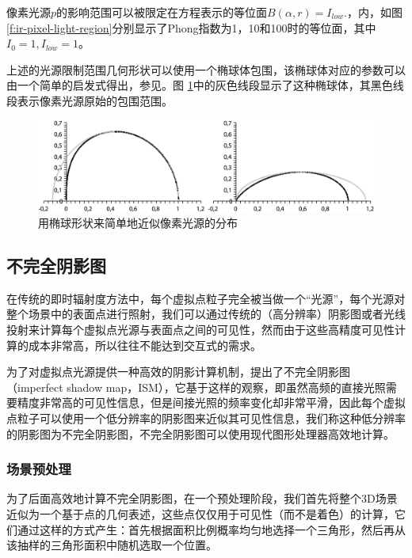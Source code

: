 像素光源$p$的影响范围可以被限定在方程表示的等位面$B(\alpha,r) = I_{low}$.，内，如图\ref{f:ir-pixel-light-region}分别显示了Phong指数为1，10和100时的等位面，其中$I_0 = 1, I_{low} = 1$。

上述的光源限制范围几何形状可以使用一个椭球体包围，该椭球体对应的参数可以由一个简单的启发式得出，参见\cite{a:SplattingIndirectIllumination}。图 \ref{f:ir-ellipses}中的灰色线段显示了这种椭球体，其黑色线段表示像素光源原始的包围范围。

\begin{figure}
	\begin{center}
		\includegraphics[width=\textwidth]{figures/ir/ir-3-7}
	\end{center}
	\caption{用椭球形状来简单地近似像素光源的分布}
	\label{f:ir-ellipses}
\end{figure}




\subsection{不完全阴影图}\label{sec:ir-ISM}
在传统的即时辐射度方法中，每个虚拟点粒子完全被当做一个“光源”，每个光源对整个场景中的表面点进行照射，我们可以通过传统的（高分辨率）阴影图或者光线投射来计算每个虚拟点光源与表面点之间的可见性，然而由于这些高精度可见性计算的成本非常高，所以往往不能达到交互式的需求。

为了对虚拟点光源提供一种高效的阴影计算机制，\cite{a:ImperfectShadowMapsforEfficientComputationofIndirectIllumination}提出了不完全阴影图（imperfect shadow map，ISM），它基于这样的观察，即虽然高频的直接光照需要精度非常高的可见性信息，但是间接光照的频率变化却非常平滑，因此每个虚拟点粒子可以使用一个低分辨率的阴影图来近似其可见性信息，我们称这种低分辨率的阴影图为不完全阴影图，不完全阴影图可以使用现代图形处理器高效地计算。




\subsubsection{场景预处理}\label{sec:ir-point-based-representation}
为了后面高效地计算不完全阴影图，在一个预处理阶段，我们首先将整个3D场景近似为一个基于点的几何表述，这些点仅仅用于可见性（而不是着色）的计算，它们通过这样的方式产生：首先根据面积比例概率均匀地选择一个三角形，然后再从该抽样的三角形面积中随机选取一个位置。

